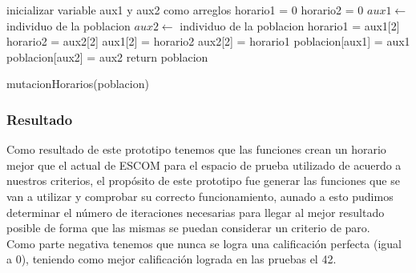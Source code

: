 \begin{algorithm}[H]
	\DontPrintSemicolon
	\SetAlgoLined
	inicializar variable aux1 y aux2 como arreglos\;
	horario1 = 0\;
	horario2 = 0\;
	$aux1 \leftarrow $ individuo de la poblacion\;
	$aux2 \leftarrow $ individuo de la poblacion\;
	horario1 = aux1[2]\;
	horario2 = aux2[2]\;
	aux1[2] = horario2\;
	aux2[2] = horario1\;
	poblacion[aux1] = aux1\;
	poblacion[aux2] = aux2\;
	return poblacion \;
	\caption{mutacionHorarios(poblacion)}
	\end{algorithm}  

\subsubsection{Resultado}

Como resultado de este prototipo tenemos que las funciones crean un horario mejor que el actual de ESCOM para el espacio de prueba utilizado de acuerdo a nuestros criterios, el propósito de este prototipo fue generar las funciones que se van a utilizar y comprobar su correcto funcionamiento, aunado a esto pudimos determinar el número de iteraciones necesarias para llegar al mejor resultado posible de forma que las mismas se puedan considerar un criterio de paro.\\

Como parte negativa tenemos que nunca se logra una calificación perfecta (igual a 0), teniendo como mejor calificación lograda en las pruebas el 42.\\